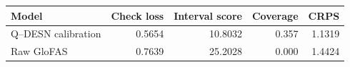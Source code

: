 \begin{tabular}{lrrrr}
\toprule
Model & Check loss & Interval score & Coverage & CRPS \\
\midrule
Q--DESN calibration & 0.5654 & 10.8032 & 0.357 & 1.1319 \\
Raw GloFAS & 0.7639 & 25.2028 & 0.000 & 1.4424 \\
\bottomrule
\end{tabular}
